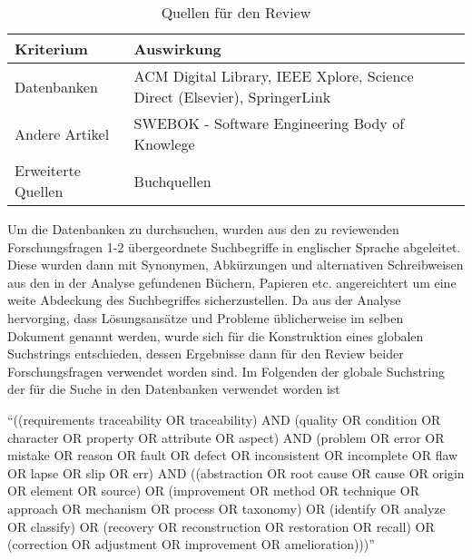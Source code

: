 \begin{table}[!ht]
\renewcommand{\arraystretch}{1.3}
\centering
\begin{threeparttable}
\begin{tabularx}{\columnwidth}{@{}lX@{}}
\toprule
Kriterium & Auswirkung \\ \midrule
Datenbanken & ACM Digital Library, IEEE Xplore, Science Direct (Elsevier), SpringerLink \\
Andere Artikel & SWEBOK - Software Engineering Body of Knowlege \\
Erweiterte Quellen & Buchquellen \\
\bottomrule
\end{tabularx}
\medskip
\end{threeparttable}
\caption{Quellen für den Review}
\label{tab:quellen_review}
\end{table}

Um die Datenbanken zu durchsuchen, wurden aus den zu reviewenden Forschungsfragen 1-2 übergeordnete Suchbegriffe in englischer Sprache abgeleitet. Diese wurden dann mit Synonymen, Abkürzungen und alternativen Schreibweisen aus den in der Analyse gefundenen Büchern, Papieren etc. angereichtert um eine weite Abdeckung des Suchbegriffes sicherzustellen. Da aus der Analyse hervorging, dass Lösungsansätze und Probleme üblicherweise im selben Dokument genannt werden, wurde sich für die Konstruktion eines globalen Suchstrings entschieden, dessen Ergebnisse dann für den Review beider Forschungsfragen verwendet worden sind. Im Folgenden der globale Suchstring der für die Suche in den Datenbanken verwendet worden ist

\enquote{((requirements traceability OR traceability) AND (quality OR condition OR character OR property OR attribute OR aspect) AND (problem OR error OR mistake OR reason OR fault OR defect OR inconsistent OR incomplete OR flaw OR lapse OR slip OR err) AND ((abstraction OR root cause OR cause OR origin OR element OR source) OR (improvement OR method OR technique OR approach OR mechanism OR process OR taxonomy) OR (identify OR analyze OR classify) OR (recovery OR reconstruction OR restoration OR recall) OR (correction OR adjustment OR improvement OR amelioration)))}

